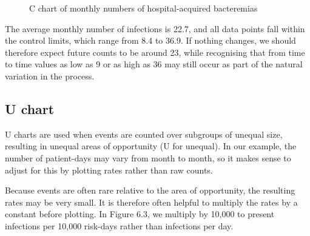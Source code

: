 \documentclass[
]{book}
\makeatletter
\newcommand*\pandocbounded[1]{%
  \sbox\pandoc@box{#1}%
  \Gscale@div\@tempa{\textheight}{\dimexpr\ht\pandoc@box+\dp\pandoc@box\relax}%
  \Gscale@div\@tempb{\linewidth}{\wd\pandoc@box}%
  \ifdim\@tempb\p@<\@tempa\p@\let\@tempa\@tempb\fi%
  \ifdim\@tempa\p@<\p@\scalebox{\@tempa}{\usebox\pandoc@box}%
  \else\usebox{\pandoc@box}%
  \fi%
}
\makeatother
\begin{document}
\begin{figure}
\centering
\pandocbounded{}
\caption{C chart of monthly numbers of hospital-acquired bacteremias}
\end{figure}

The average monthly number of infections is 22.7, and all data points
fall within the control limits, which range from 8.4 to 36.9. If nothing
changes, we should therefore expect future counts to be around 23, while
recognising that from time to time values as low as 9 or as high as 36
may still occur as part of the natural variation in the process.

\subsection{U chart}\label{u-chart}

U charts are used when events are counted over subgroups of unequal
size, resulting in unequal areas of opportunity (U for unequal). In our
example, the number of patient-days may vary from month to month, so it
makes sense to adjust for this by plotting rates rather than raw counts.

Because events are often rare relative to the area of opportunity, the
resulting rates may be very small. It is therefore often helpful to
multiply the rates by a constant before plotting. In Figure 6.3, we
multiply by 10,000 to present infections per 10,000 risk-days rather
than infections per day.
\end{document}
